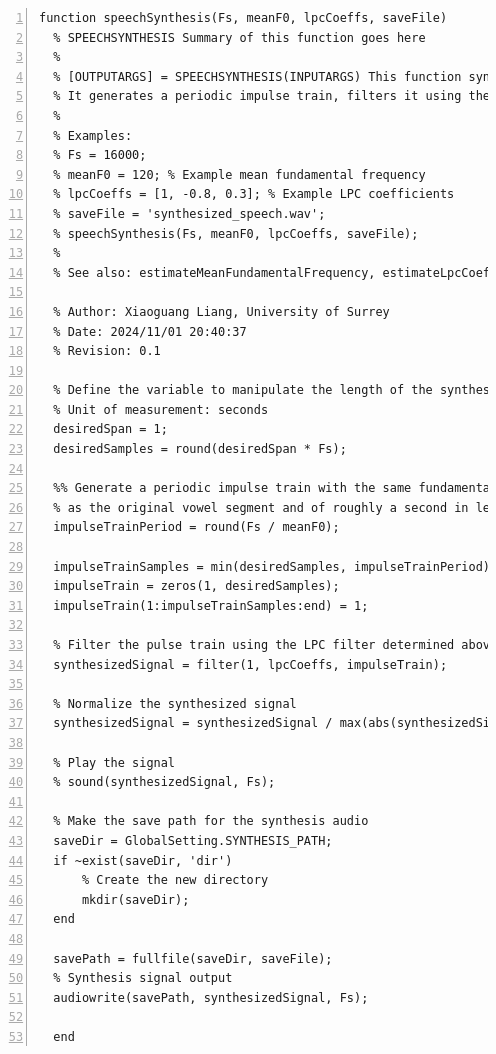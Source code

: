 \documentclass{article}
\begin{document}
\begin{lstlisting}[frame=single, numbers=left, style=Matlab-editor, caption={speechSynthesis.m}, label={lst:speechSynthesis}]
  function speechSynthesis(Fs, meanF0, lpcCoeffs, saveFile)
  % SPEECHSYNTHESIS Summary of this function goes here
  %
  % [OUTPUTARGS] = SPEECHSYNTHESIS(INPUTARGS) This function synthesizes speech using the given fundamental frequency, LPC coefficients, and sampling rate.
  % It generates a periodic impulse train, filters it using the LPC coefficients, normalizes the synthesized signal, and saves it to a specified file.
  %
  % Examples:
  % Fs = 16000;
  % meanF0 = 120; % Example mean fundamental frequency
  % lpcCoeffs = [1, -0.8, 0.3]; % Example LPC coefficients
  % saveFile = 'synthesized_speech.wav';
  % speechSynthesis(Fs, meanF0, lpcCoeffs, saveFile);
  %
  % See also: estimateMeanFundamentalFrequency, estimateLpcCoeficients
  
  % Author: Xiaoguang Liang, University of Surrey
  % Date: 2024/11/01 20:40:37
  % Revision: 0.1
  
  % Define the variable to manipulate the length of the synthesized signal
  % Unit of measurement: seconds
  desiredSpan = 1;
  desiredSamples = round(desiredSpan * Fs);
  
  %% Generate a periodic impulse train with the same fundamental frequency
  % as the original vowel segment and of roughly a second in length
  impulseTrainPeriod = round(Fs / meanF0);
  
  impulseTrainSamples = min(desiredSamples, impulseTrainPeriod);
  impulseTrain = zeros(1, desiredSamples);
  impulseTrain(1:impulseTrainSamples:end) = 1;
  
  % Filter the pulse train using the LPC filter determined above
  synthesizedSignal = filter(1, lpcCoeffs, impulseTrain);
  
  % Normalize the synthesized signal
  synthesizedSignal = synthesizedSignal / max(abs(synthesizedSignal));
  
  % Play the signal
  % sound(synthesizedSignal, Fs);
  
  % Make the save path for the synthesis audio
  saveDir = GlobalSetting.SYNTHESIS_PATH;
  if ~exist(saveDir, 'dir')
      % Create the new directory
      mkdir(saveDir);
  end
  
  savePath = fullfile(saveDir, saveFile);
  % Synthesis signal output
  audiowrite(savePath, synthesizedSignal, Fs);
  
  end

\end{lstlisting}
\end{document}
